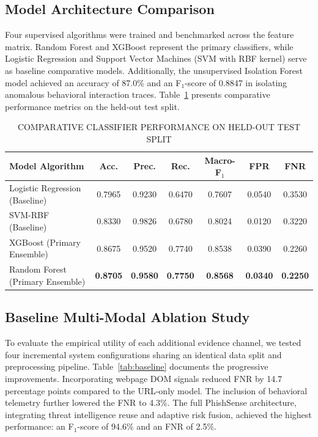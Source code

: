 \documentclass[conference]{IEEEtran}
\begin{document}
\subsection{Model Architecture Comparison}
Four supervised algorithms were trained and benchmarked across the feature matrix.
Random Forest and XGBoost represent the primary classifiers, while Logistic Regression and Support
Vector Machines (SVM with RBF kernel) serve as baseline comparative models.
Additionally, the unsupervised Isolation Forest model achieved an accuracy of 87.0\% and an F$_1$-score
of 0.8847 in isolating anomalous behavioral interaction traces.
Table~\ref{tab:models} presents comparative performance metrics on the held-out test split.

\begin{table}[!t]
\caption{COMPARATIVE CLASSIFIER PERFORMANCE ON HELD-OUT TEST SPLIT}
\label{tab:models}
\centering
\scriptsize
\setlength{\tabcolsep}{4pt}
\begin{tabular}{|l|c|c|c|c|c|c|}
\hline
\textbf{Model Algorithm} & \textbf{Acc.} & \textbf{Prec.} & \textbf{Rec.} & \textbf{Macro-F$_1$} & \textbf{FPR} & \textbf{FNR} \\ \hline
Logistic Regression (Baseline) & 0.7965 & 0.9230 & 0.6470 & 0.7607 & 0.0540 & 0.3530 \\ \hline
SVM-RBF (Baseline)             & 0.8330 & 0.9826 & 0.6780 & 0.8024 & 0.0120 & 0.3220 \\ \hline
XGBoost (Primary Ensemble)     & 0.8675 & 0.9520 & 0.7740 & 0.8538 & 0.0390 & 0.2260 \\ \hline
Random Forest (Primary Ensemble)& \textbf{0.8705} & \textbf{0.9580} & \textbf{0.7750} & \textbf{0.8568} & \textbf{0.0340} & \textbf{0.2250} \\ \hline
\end{tabular}
\end{table}

\subsection{Baseline Multi-Modal Ablation Study}
To evaluate the empirical utility of each additional evidence channel, we tested four incremental
system configurations sharing an identical data split and preprocessing pipeline.
Table~\ref{tab:baseline} documents the progressive improvements.
Incorporating webpage DOM signals reduced FNR by 14.7 percentage points compared to the URL-only model.
The inclusion of behavioral telemetry further lowered the FNR to 4.3\%.
The full PhishSense architecture, integrating threat intelligence reuse and adaptive risk fusion,
achieved the highest performance: an F$_1$-score of 94.6\% and an FNR of 2.5\%.
\end{document}
